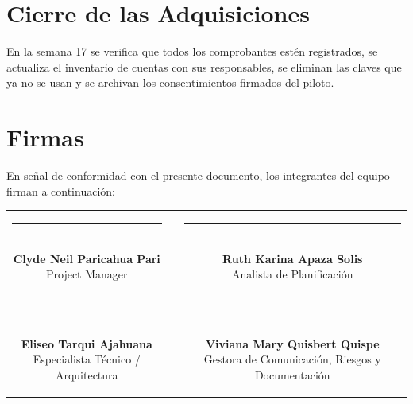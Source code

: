 \documentclass[11pt,a4paper]{article}
\begin{document}
\section{Cierre de las Adquisiciones}
En la semana 17 se verifica que todos los comprobantes estén registrados, se actualiza el inventario de cuentas con sus responsables, se eliminan las claves que ya no se usan y se archivan los consentimientos firmados del piloto.

\section{Firmas}
\noindent En señal de conformidad con el presente documento, los integrantes del equipo firman a continuación:

\vspace{1.5cm}
\begin{center}
\begin{tabular}{c c c}
    \parbox{6.5cm}{\centering \rule{6.0cm}{0.6pt}\\[5pt] \textbf{Clyde Neil Paricahua Pari}\\[2pt] {\footnotesize Project Manager}}
    & \hspace{0.8cm} &
    \parbox{6.5cm}{\centering \rule{6.0cm}{0.6pt}\\[5pt] \textbf{Ruth Karina Apaza Solis}\\[2pt] {\footnotesize Analista de Planificación}}
    \\[2.0cm]
    \parbox{6.5cm}{\centering \rule{6.0cm}{0.6pt}\\[5pt] \textbf{Eliseo Tarqui Ajahuana}\\[2pt] {\footnotesize Especialista Técnico / Arquitectura}}
    & \hspace{0.8cm} &
    \parbox{6.5cm}{\centering \rule{6.0cm}{0.6pt}\\[5pt] \textbf{Viviana Mary Quisbert Quispe}\\[2pt] {\footnotesize Gestora de Comunicación, Riesgos y Documentación}}
\end{tabular}
\end{center}
\end{document}

